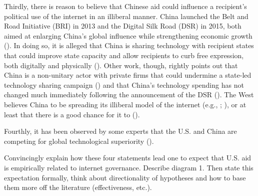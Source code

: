 Thirdly, there is reason to believe that Chinese aid could influence a recipient's political use of the internet in an illiberal manner. China launched the Belt and Road Initiative (BRI) in 2013 and the Digital Silk Road (DSR) in 2015, both aimed at enlarging China's global influence while strengthening economic growth (\cite{dreher2022}). In doing so, it is alleged that China is sharing technology with recipient states that could improve state capacity and allow recipients to curb free expression, both digitally and physically (\cite{hillman2021}). Other work, though, rightly points out that China is a non-unitary actor with private firms that could undermine a state-led technology sharing campaign (\cite{shen2018a}) and that China's technology spending has not changed much immediately following the announcement of the DSR (\cite{tugendhat2021}). The West believes China to be spreading its illiberal model of the internet (e.g., \cite{hillman2021}; \cite{u.s.departmentofstate2022}), or at least that there is a good chance for it to (\cite{triolo2020}).

Fourthly, it has been observed by some experts that the U.S. and China are competing for global technological superiority (\cite{hass2021}).

Convincingly explain how these four statements lead one to expect that U.S. aid is empirically related to internet governance. Describe diagram 1. Then state this expectation formally, think about directionality of hypotheses and how to base them more off the literature (effectiveness, etc.).

\pagebreak
